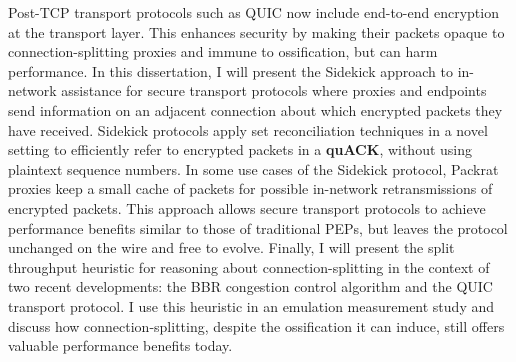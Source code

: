 
Post-TCP transport protocols such as QUIC now include end-to-end encryption at
the transport layer. This enhances security by making their packets opaque to
connection-splitting proxies and immune to ossification, but can harm
performance. In this dissertation, I will present the Sidekick approach to
in-network assistance for secure transport protocols where proxies and
endpoints send information on an adjacent connection about which encrypted
packets they have received. Sidekick protocols apply set reconciliation
techniques in a novel setting to efficiently refer to encrypted packets in
a \textbf{quACK}, without using plaintext sequence numbers. In some use cases
of the Sidekick protocol, Packrat proxies keep a small cache of packets for
possible in-network retransmissions of encrypted packets. This approach allows
secure transport protocols to achieve performance benefits similar to those of
traditional PEPs, but leaves the protocol unchanged on the wire and free to
evolve. Finally, I will present the split throughput heuristic for reasoning
about connection-splitting in the context of two recent developments:
the BBR congestion control algorithm and the QUIC transport protocol.
I use this heuristic in an emulation measurement study and discuss how
connection-splitting, despite the ossification it can induce, still offers
valuable performance benefits today.
